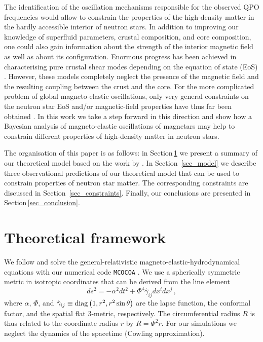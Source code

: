\documentclass[useAMS,usenatbib]{mnras}
\begin{document}
The identification of the oscillation mechanisms responsible for the observed 
QPO frequencies would allow to constrain the properties of the high-density 
matter in the hardly accessible interior of neutron stars. In addition to 
improving our knowledge of superfluid parameters, crustal composition, and core 
composition, one could also gain information about the strength of the interior 
magnetic field as well as about its configuration. Enormous progress has been 
achieved in characterising  pure crustal shear modes depending on the equation 
of state (EoS) \citep{Steiner2009, Sotani2011, Sotani2012, Sotani2013, 
Sotani2013b, Sotani2016}. However, these models completely neglect the presence 
of the magnetic field and the resulting coupling between the crust and the core. 
For the more complicated problem of global magneto-elastic oscillations, only 
very general constraints on the neutron star EoS and/or magnetic-field 
properties have thus far been obtained \citep{Sotani2008, Andersson2009, 
Colaiuda2011, Gabler2013b}. In this work we take a step forward in this 
direction and show how a Bayesian analysis of magneto-elastic oscillations of 
magnetars may help to constrain different properties of high-density matter in 
neutron stars.

The organisation of this paper is as follows: in Section\,\ref{sec_theory} we present a summary of our theoretical model based on the work by \cite{Gabler2016}. In Section~\ref{sec_model} we describe three observational predictions of our theoretical model that can be used to constrain properties of neutron star matter.  The corresponding constraints are discussed in Section~\ref{sec_constraints}. Finally, our conclusions are presented in Section\,\ref{sec_conclusion}.


%

\section{Theoretical framework}\label{sec_theory}

We follow \cite{Gabler2016} and solve the general-relativistic magneto-elastic-hydrodynamical equations with our numerical code {\tt MCOCOA}  \citep[see also][for details]{Cerda2008, Cerda2009, Gabler2011letter, Gabler2012, Gabler2013a}. 
We use a spherically symmetric metric in isotropic coordinates that can be derived from the line element 
%
\begin{equation}
 ds^2 = - \alpha^2 dt^2 + \Phi^4\hat\gamma_{ij} dx^i dx^j \,,
\end{equation}
%
where $\alpha$, $\Phi$, and $\hat\gamma_{ij}\equiv{\rm diag}\left(1,r^2,r^2 \sin\theta\right)$ are the lapse function, the conformal factor, and the spatial flat 3-metric, respectively. The circumferential radius $R$ is thus related to the coordinate radius $r$ by $R=\Phi^2 r$. For our simulations we neglect the dynamics of the spacetime (Cowling approximation).
\end{document}
